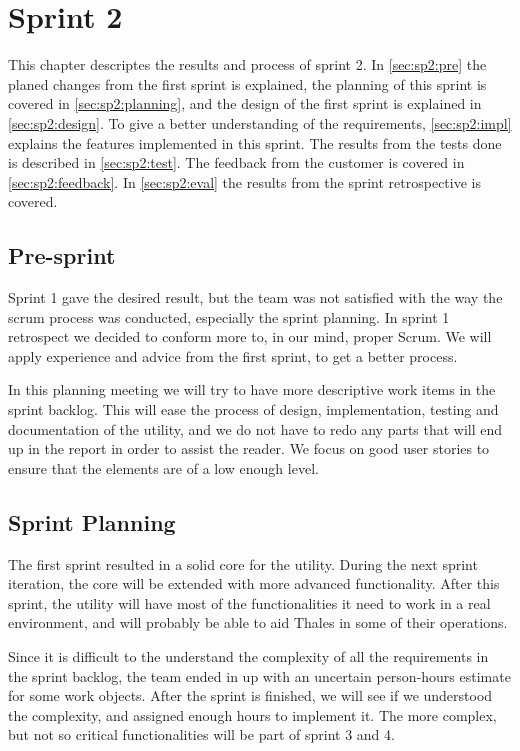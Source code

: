 \chapter{Sprint 2}
This chapter descriptes the results and process of sprint 2. In 
\autoref{sec:sp2:pre} the planed changes from the first sprint is explained, 
the planning of this sprint is covered in \autoref{sec:sp2:planning}, and the 
design of the first sprint is explained in \autoref{sec:sp2:design}. To give a 
better understanding of the requirements, \autoref{sec:sp2:impl} explains the 
features implemented in this sprint. The results from the tests done is 
described in \autoref{sec:sp2:test}. The feedback from the customer is covered 
in \autoref{sec:sp2:feedback}. In \autoref{sec:sp2:eval} the results from the 
sprint retrospective is covered.

\section{Pre-sprint}
\label{sec:sp2:pre}
Sprint 1 gave the desired result, but the team was not satisfied with the way the \Gls{scrum} process was conducted, especially the sprint planning. In sprint 1 retrospect we decided to conform more to, in our mind, proper Scrum. We will apply experience and advice from the first sprint, to get a better process. 

In this planning meeting we will try to have more descriptive work items in the sprint backlog. This will ease the process of design, implementation, testing and documentation of the \gls{utility}, and we do not have to redo any parts that will end up in the report in order to assist the reader. We focus on good user stories to ensure that the elements are of a low enough level.


\section{Sprint Planning}
\label{sec:sp2:planning}
The first sprint resulted in a solid core for the \gls{utility}. During the next sprint iteration, the core will be extended with more advanced functionality. After this sprint, the \gls{utility} will have most of the functionalities it need to work in a real environment, and will probably be able to aid Thales in some of their operations.

Since it is difficult to the understand the complexity of all the requirements in the sprint backlog, the team ended in up with an uncertain person-hours estimate for some work objects. After the sprint is finished, we will see if we understood the complexity, and assigned enough hours to implement it. The more complex, but not so critical functionalities will be part of sprint 3 and 4.   

